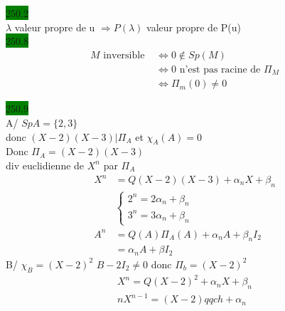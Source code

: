 \documentclass{article}
\begin{document}
 \noindent
\colorbox{green}{250.2}\\
\(\lambda\) valeur propre de u \(\Rightarrow P(\lambda)\) valeur propre de P(u)\\

\noindent \colorbox{green}{250.8}\\
\begin{align*}
    M \text{ inversible } &\Leftrightarrow 0 \notin Sp(M)\\
    &\Leftrightarrow 0 \text{ n'est pas racine de } \Pi_M\\
    &\Leftrightarrow \Pi_m(0) \neq 0
\end{align*}

\noindent \colorbox{green}{250.9}\\
A/ \(SpA = \{2,3\}\)\\ 
donc \((X-2)(X-3)|\Pi_A\) et \(\chi_A(A) = 0\)\\
Donc \(\Pi_A = (X-2)(X-3)\)\\
div euclidienne de \(X^n\) par \(\Pi_A\)\begin{align*}
    X^n &= Q(X-2)(X-3) + \alpha_n X + \beta_n \\
    &\begin{cases}
        2^n = 2\alpha_n + \beta_n\\
        3^n = 3\alpha_n + \beta_n
    \end{cases}\\
    A^n &= Q(A)\Pi_A(A) + \alpha_n A + \beta_n I_2\\
    &= \alpha_n A + \beta I_2
\end{align*}
B/ \(\chi_B = (X-2)^2\) 
\(B-2I_2 \neq 0\) donc \(\Pi_b = (X-2)^2\)\begin{align*}
    X^n = Q(X-2)^2 + \alpha_n X + \beta_n \\
    nX^{n-1} = (X-2)qqch + \alpha_n
\end{align*}
\end{document}

